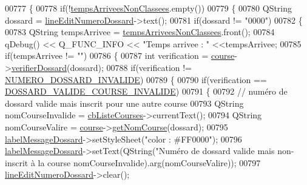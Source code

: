 \begin{DoxyCode}
00777 \{
00778     \textcolor{keywordflow}{if}(!\hyperlink{class_i_h_m_chrono_cross_a9d0542a5334cd284d1ea9cf732cb013e}{tempsArriveesNonClassees}.empty())
00779     \{
00780         QString dossard = \hyperlink{class_i_h_m_chrono_cross_ad2e156ff9412644debf8da7a3ec1566d}{lineEditNumeroDossard}->text();
00781         \textcolor{keywordflow}{if}(dossard != \textcolor{stringliteral}{"0000"})
00782         \{
00783             QString tempsArrivee = \hyperlink{class_i_h_m_chrono_cross_a9d0542a5334cd284d1ea9cf732cb013e}{tempsArriveesNonClassees}.front();
00784             qDebug() << Q\_FUNC\_INFO << \textcolor{stringliteral}{"Temps arrivee : "} <<tempsArrivee;
00785             \textcolor{keywordflow}{if}(tempsArrivee != \textcolor{stringliteral}{""})
00786             \{
00787                 \textcolor{keywordtype}{int} verification = \hyperlink{class_i_h_m_chrono_cross_a03a8226c0e7f423d29302d9a06284ab4}{course}->\hyperlink{class_course_a6cb3ede6a11e4813f95be92f4459a3c2}{verifierDossard}(dossard);
00788                 \textcolor{keywordflow}{if}(verification != \hyperlink{ihmchronocross_8h_a87a6eb8b1f31f4dda05bfb0016494b7f}{NUMERO\_DOSSARD\_INVALIDE})
00789                 \{
00790                     \textcolor{keywordflow}{if}(verification == \hyperlink{ihmchronocross_8h_a999a34fef9415ff9b78e8dbc638a6059}{DOSSARD\_VALIDE\_COURSE\_INVALIDE})
00791                     \{
00792                     \textcolor{comment}{// numéro de dossard valide mais inscrit pour une autre course}
00793                         QString nomCourseInvalide = \hyperlink{class_i_h_m_chrono_cross_af47891e3e9f2bb2c955be8c128e830b5}{cbListeCourses}->currentText();
00794                         QString nomCourseValire = \hyperlink{class_i_h_m_chrono_cross_a03a8226c0e7f423d29302d9a06284ab4}{course}->\hyperlink{class_course_a7b4485a0b38bc3b908131962b705d880}{getNomCourse}(dossard);
00795                         \hyperlink{class_i_h_m_chrono_cross_abd23647486d38e6f57aef1faf50757af}{labelMessageDossard}->setStyleSheet(\textcolor{stringliteral}{"color : #FF0000"});
00796                         \hyperlink{class_i_h_m_chrono_cross_abd23647486d38e6f57aef1faf50757af}{labelMessageDossard}->setText(QString(\textcolor{stringliteral}{"Numéro de dossard %
       valide mais non-inscrit à la course %
      nomCourseInvalide).arg(nomCourseValire));
00797                         \hyperlink{class_i_h_m_chrono_cross_ad2e156ff9412644debf8da7a3ec1566d}{lineEditNumeroDossard}->clear();
}
\end{DoxyCode}
